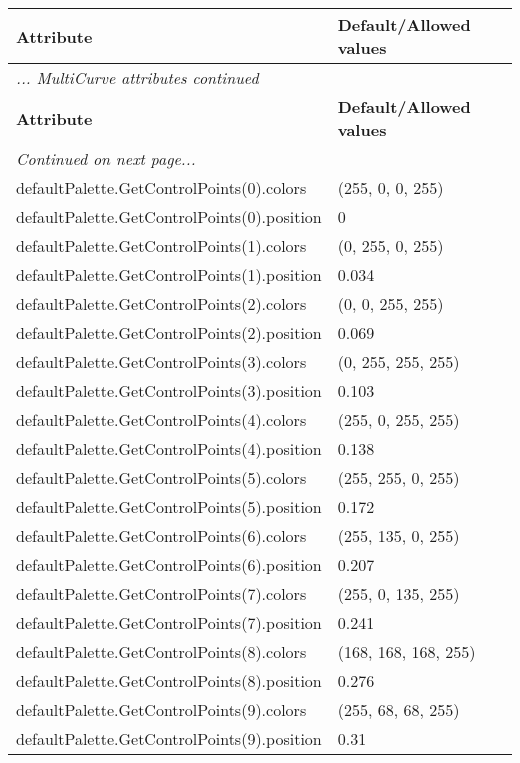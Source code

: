 \documentclass[10pt,a4paper]{report}
\begin{document}
\begin{longtable}{lp{7.5cm}}
{\bf Attribute} & {\bf Default/Allowed values} \\
\hline \hline
\endfirsthead
\multicolumn{2}{l}{{\it ... MultiCurve attributes continued}} \\
{\bf Attribute} & {\bf Default/Allowed values} \\
\hline \hline
\endhead
\hline
\multicolumn{2}{l}{{\it Continued on next page...}} \\
\endfoot
\hline
\endlastfoot

defaultPalette.GetControlPoints(0).colors  &  (255, 0, 0, 255) \\
defaultPalette.GetControlPoints(0).position  &  0 \\
defaultPalette.GetControlPoints(1).colors  &  (0, 255, 0, 255) \\
defaultPalette.GetControlPoints(1).position  &  0.034 \\
defaultPalette.GetControlPoints(2).colors  &  (0, 0, 255, 255) \\
defaultPalette.GetControlPoints(2).position  &  0.069 \\
defaultPalette.GetControlPoints(3).colors  &  (0, 255, 255, 255) \\
defaultPalette.GetControlPoints(3).position  &  0.103 \\
defaultPalette.GetControlPoints(4).colors  &  (255, 0, 255, 255) \\
defaultPalette.GetControlPoints(4).position  &  0.138 \\
defaultPalette.GetControlPoints(5).colors  &  (255, 255, 0, 255) \\
defaultPalette.GetControlPoints(5).position  &  0.172 \\
defaultPalette.GetControlPoints(6).colors  &  (255, 135, 0, 255) \\
defaultPalette.GetControlPoints(6).position  &  0.207 \\
defaultPalette.GetControlPoints(7).colors  &  (255, 0, 135, 255) \\
defaultPalette.GetControlPoints(7).position  &  0.241 \\
defaultPalette.GetControlPoints(8).colors  &  (168, 168, 168, 255) \\
defaultPalette.GetControlPoints(8).position  &  0.276 \\
defaultPalette.GetControlPoints(9).colors  &  (255, 68, 68, 255) \\
defaultPalette.GetControlPoints(9).position  &  0.31 \\

\end{longtable}
\end{document}
